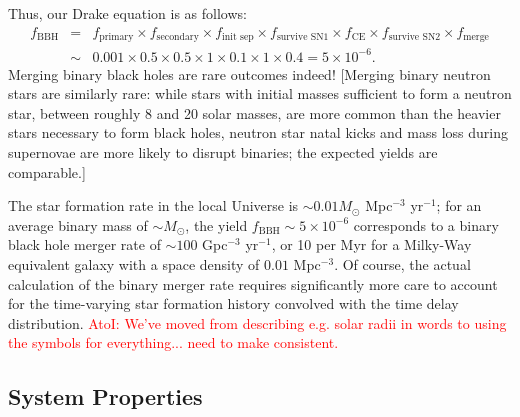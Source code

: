 \documentclass[iop,onecolumn]{revtex4}
\newcommand{\ajf}[1]{\textcolor{red}{AtoI: #1}}
\begin{document}
Thus, our Drake equation is as follows:
\begin{eqnarray}
f_\textrm{BBH} &=& f_\textrm{primary} \times f_\textrm{secondary} \times f_\textrm{init sep} \times f_\textrm{survive SN1} \times f_\textrm{CE} \times f_\textrm{survive SN2} \times f_\textrm{merge} \nonumber \\
 & \sim & 0.001 \times 0.5 \times 0.5 \times 1 \times 0.1 \times 1 \times 0.4 = 5 \times 10^{-6}.
\end{eqnarray}
Merging binary black holes are rare outcomes indeed!  [Merging binary neutron stars are similarly rare: while stars with initial masses sufficient to form a neutron star, between roughly 8 and 20 solar masses, are more common than the heavier stars necessary to form black holes, neutron star natal kicks and mass loss during supernovae are more likely to disrupt binaries; the expected yields are comparable.]

The star formation rate in the local Universe is $\sim 0.01 M_\odot$ Mpc$^{-3}$ yr$^{-1}$; for an average binary mass of $\sim M_\odot$, the yield $f_\textrm{BBH} \sim 5 \times 10^{-6}$ corresponds to a binary black hole merger rate of $\sim 100$ Gpc$^{-3}$ yr$^{-1}$, or 10 per Myr for a Milky-Way equivalent galaxy with a space density of $0.01$ Mpc$^{-3}$.  Of course, the actual calculation of the binary merger rate requires significantly more care to account for the time-varying star formation history convolved with the time delay distribution.  \ajf{We've moved from describing e.g. solar radii in words to using the symbols for everything... need to make consistent.}

\subsection{System Properties}
\end{document}
